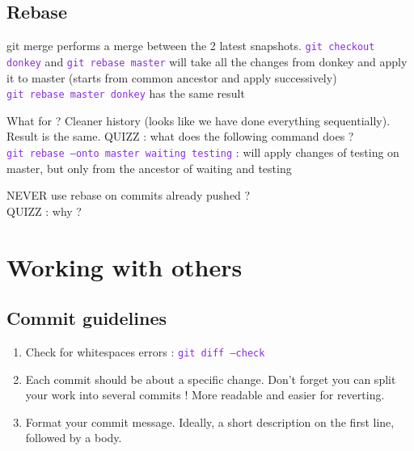 \documentclass{article}
\def\cmd#1{\texttt{\textcolor{blueviolet}{#1}}}
\begin{document}
\subsection{Rebase}
git merge performs a merge between the 2 latest snapshots. 
\cmd{git checkout donkey} and \cmd{git rebase master} will take all the changes
from donkey and apply it to master (starts from common ancestor and apply
successively)\\
\cmd{git rebase master donkey} has the same result

What for ? Cleaner history (looks like we have done everything sequentially).
Result is the same.
QUIZZ : what does the following command does ?\\
\cmd{git rebase --onto master waiting testing} : will apply changes of testing
on master, but only from the ancestor of waiting and testing

NEVER use rebase on commits already pushed ? \\
QUIZZ : why ?\\

\section{Working with others}
\subsection{Commit guidelines}
\begin{enumerate}
  \item Check for whitespaces errors : \cmd{git diff --check}
  \item Each commit should be about a specific change. Don't forget you can
    split your work into several commits ! More readable and easier for
    reverting.
  \item Format your commit message. Ideally, a short description on the first
    line, followed by a body.
\end{enumerate}
\end{document}
